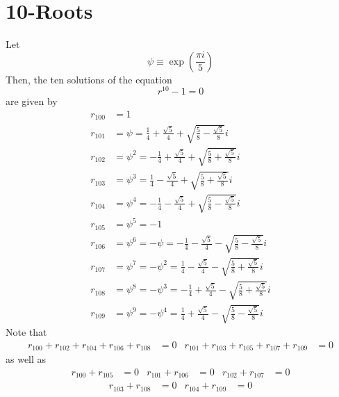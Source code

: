\section{10-Roots}
Let
\begin{equation}
    \psi \equiv \exp\left( \frac{\pi i}{5} \right)
\end{equation}
Then, the ten solutions of the equation
\begin{equation}
    r^{10} - 1 = 0
\end{equation}
are given by
\begin{align}
    r_{100} &= 1 \\
    r_{101} &= \psi = \frac{1}{4} + \frac{\sqrt{5}}{4} + \sqrt{\frac{5}{8} - \frac{\sqrt{5}}{8}} i \\
    r_{102} &= \psi^{2} = -\frac{1}{4} + \frac{\sqrt{5}}{4} + \sqrt{\frac{5}{8} + \frac{\sqrt{5}}{8}} i \\
    r_{103} &= \psi^{3} = \frac{1}{4} - \frac{\sqrt{5}}{4} + \sqrt{\frac{5}{8} + \frac{\sqrt{5}}{8}} i \\
    r_{104} &= \psi^{4} = -\frac{1}{4} - \frac{\sqrt{5}}{4} + \sqrt{\frac{5}{8} - \frac{\sqrt{5}}{8}} i \\
    r_{105} &= \psi^{5} = -1 \\
    r_{106} &= \psi^{6} = -\psi = -\frac{1}{4} - \frac{\sqrt{5}}{4} - \sqrt{\frac{5}{8} - \frac{\sqrt{5}}{8}} i \\
    r_{107} &= \psi^{7} = -\psi^{2} = \frac{1}{4} - \frac{\sqrt{5}}{4} - \sqrt{\frac{5}{8} + \frac{\sqrt{5}}{8}} i \\
    r_{108} &= \psi^{8} = -\psi^{3} = -\frac{1}{4} + \frac{\sqrt{5}}{4} - \sqrt{\frac{5}{8} + \frac{\sqrt{5}}{8}} i \\
    r_{109} &= \psi^{9} = -\psi^{4} = \frac{1}{4} + \frac{\sqrt{5}}{4} - \sqrt{\frac{5}{8} - \frac{\sqrt{5}}{8}} i
\end{align}
Note that
\begin{align}
    r_{100} + r_{102} + r_{104} + r_{106} + r_{108} &= 0 & r_{101} + r_{103} + r_{105} + r_{107} + r_{109} &= 0
\end{align}
as well as
\begin{align}
    r_{100} + r_{105} &= 0 & r_{101} + r_{106} &= 0 & r_{102} + r_{107} &= 0
\end{align}
\begin{align}
    r_{103} + r_{108} &= 0 & r_{104} + r_{109} &= 0
\end{align}
